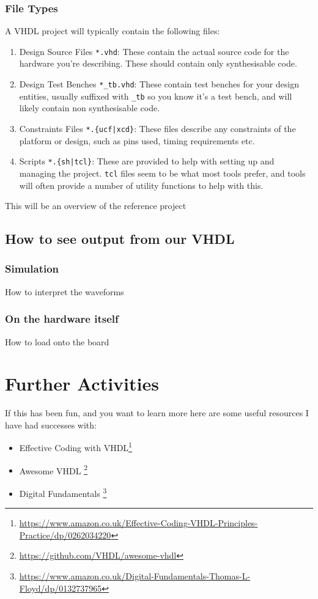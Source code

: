 \documentclass[11pt,a4paper]{article}
\begin{document}
\subsubsection{File Types}
A VHDL project will typically contain the following files:
\begin{enumerate}
    \item Design Source Files \texttt{*.vhd}: These contain the actual source code for the hardware you're describing. These should contain only synthesisable code.
    \item Design Test Benches \texttt{*\_tb.vhd}: These contain test benches for your design entities, usually suffixed with \texttt{\_tb} so you know it's a test bench, and will likely contain non synthesisable code.
    \item Constraints Files \texttt{*.\{ucf|xcd\}}: These files describe any constraints of the platform or design, such as pins used, timing requirements etc.
    \item Scripts \texttt{*.\{sh|tcl\}}: These are provided to help with setting up and managing the project. \texttt{tcl} files seem to be what most tools prefer, and tools will often provide a number of utility functions to help with this. 
\end{enumerate}

This will be an overview of the reference project
\subsection{How to see output from our VHDL}
\subsubsection{Simulation}
How to interpret the waveforms
\subsubsection{On the hardware itself}
How to load onto the board

\section{Further Activities}
If this has been fun, and you want to learn more here are some useful resources I have had successes with:

\begin{itemize}
    \item Effective Coding with VHDL\footnote{\url{https://www.amazon.co.uk/Effective-Coding-VHDL-Principles-Practice/dp/0262034220}} 
    \item Awesome VHDL \footnote{\url{https://github.com/VHDL/awesome-vhdl}}
    \item Digital Fundamentals \footnote{\url{https://www.amazon.co.uk/Digital-Fundamentals-Thomas-L-Floyd/dp/0132737965}}
\end{itemize}
\end{document}
